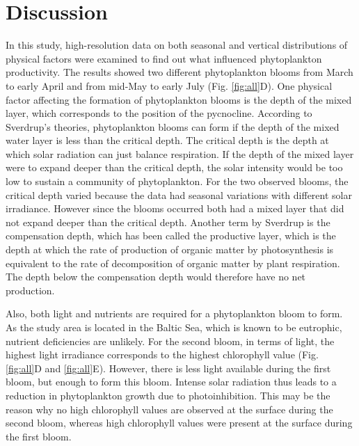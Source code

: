 \documentclass[../Main.tex]{subfiles}
\begin{document}
\section*{\crule[blue]{.3cm}{.3cm} Discussion}
In this study, high-resolution data on both seasonal and vertical distributions of physical factors were examined to find out what influenced phytoplankton productivity. The results showed two different phytoplankton blooms from March to early April and from mid-May to early July (Fig. \ref{fig:all}D). One physical factor affecting the formation of phytoplankton blooms is the depth of the mixed layer, which corresponds to the position of the pycnocline.  
According to Sverdrup's theories, phytoplankton blooms can form if the depth of the mixed water layer is less than the critical depth\supercite{Sverdrup1953OnCF}. The critical depth is the depth at which solar radiation can just balance respiration. If the depth of the mixed layer were to expand deeper than the critical depth, the solar intensity would be too low to sustain a community of phytoplankton. For the two observed blooms, the critical depth varied because the data had seasonal variations with different solar irradiance. 
However since the blooms occurred both had a mixed layer that did not expand deeper than the critical depth. Another term by Sverdrup is the compensation depth, which has been called the productive layer, which is the depth at which the rate of production of organic matter by photosynthesis is equivalent to the rate of decomposition of organic matter by plant respiration\supercite{Sverdrup1953OnCF}. 
The depth below the compensation depth would therefore have no net production. 

Also, both light and nutrients are required for a phytoplankton bloom to form\supercite{munkes2021cyanobacteria}. 
As the study area is located in the Baltic Sea, which is known to be eutrophic, nutrient deficiencies are unlikely\supercite{munkes2021cyanobacteria}. 
For the second bloom, in terms of light, the highest light irradiance corresponds to the highest chlorophyll value (Fig. \ref{fig:all}D and \ref{fig:all}E). However, there is less light available during the first bloom, but enough to form this bloom. Intense solar radiation thus leads to a reduction in phytoplankton growth due to photoinhibition\supercite{edwards2016phytoplankton}. 
This may be the reason why no high chlorophyll values are observed at the surface during the second bloom, whereas high chlorophyll values were present at the surface during the first bloom. 
\end{document}
